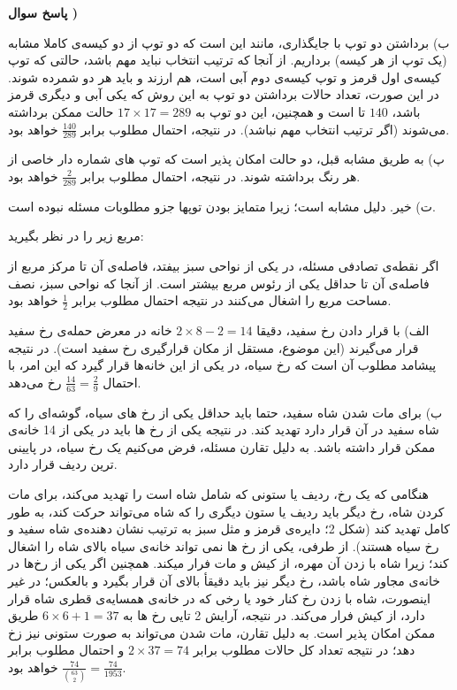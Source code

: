 \documentclass[10pt,letterpaper]{report}
\newcounter{questionanswernumber}
\newcommand{\QA}{
\textbf{پاسخ سوال \thequestionanswernumber)}
\stepcounter{questionanswernumber}
}
\begin{document}
\QA

ب) برداشتن دو توپ با جایگذاری، مانند این است که دو توپ از دو کیسه‌ی کاملا مشابه (یک توپ از هر کیسه) برداریم. از آنجا که ترتیب انتخاب نباید مهم باشد، حالتی که توپ کیسه‌ی اول قرمز و توپ کیسه‌ی دوم آبی است، هم ارزند و باید هر دو شمرده شوند. در این صورت، تعداد حالات برداشتن دو توپ به این روش که یکی آبی و دیگری قرمز باشد،
$
140
$
تا است و همچنین، این دو توپ به 
$
{17\times 17}=289
$
حالت ممکن برداشته می‌شوند (اگر ترتیب انتخاب مهم نباشد). در نتیجه، احتمال مطلوب برابر 
$
\frac{140}{289}
$
خواهد بود.

پ) به طریق مشابه قبل، دو حالت امکان پذیر است که توپ های شماره دار خاصی از هر رنگ برداشته شوند. در نتیجه، احتمال مطلوب برابر 
$
\frac{2}{289}
$
خواهد بود.

ت) خیر. دلیل مشابه است؛ زیرا متمایز بودن توپها جزو مطلوبات مسئله نبوده است.

\Q

مربع زیر را در نظر بگیرید:
\begin{figure}[h]
\centering
{}
\end{figure}
اگر نقطه‌ی تصادفی مسئله، در یکی از نواحی سبز بیفتد، فاصله‌ی آن تا مرکز مربع از فاصله‌ی آن تا حداقل یکی از رئوس مربع بیشتر است. از آنجا که نواحی سبز، نصف مساحت مربع را اشغال می‌کنند در نتیجه احتمال مطلوب برابر 
$
\frac{1}{2}
$
خواهد بود.


\Q

الف) با قرار دادن رخ سفید، دقیقا 
$
2\times 8-2=14
$
خانه در معرض حمله‌ی رخ سفید قرار می‌گیرند (این موضوع، مستقل از مکان قرارگیری رخ سفید است). در نتیجه پیشامد مطلوب آن است که رخ سیاه، در یکی از این خانه‌ها قرار گیرد که این امر، با احتمال 
$
\frac{14}{63}=\frac{2}{9}
$
رخ می‌دهد.

ب) برای مات شدن شاه سفید، حتما باید حداقل یکی از رخ های سیاه، گوشه‌ای را که شاه سفید در آن قرار دارد تهدید کند. در نتیجه یکی از رخ ها باید در یکی از 14 خانه‌ی ممکن قرار داشته باشد. به دلیل تقارن مسئله، فرض می‌کنیم یک رخ سیاه، در پایینی ترین ردیف قرار دارد.

هنگامی که یک رخ، ردیف یا ستونی که شامل شاه است را تهدید می‌کند، برای مات کردن شاه، رخ دیگر باید ردیف یا ستون دیگری را که شاه می‌تواند حرکت کند، به طور کامل تهدید کند (شکل 2؛ دایره‌ی قرمز و مثل سبز به ترتیب نشان دهنده‌ی شاه سفید و رخ سیاه هستند). از طرفی، یکی از رخ ها نمی تواند خانه‌ی سیاه بالای شاه را اشغال کند؛ زیرا شاه با زدن آن مهره، از کیش و مات فرار میکند. همچنین اگر یکی از رخ‌ها در خانه‌ی مجاور شاه باشد، رخ دیگر نیز باید دقیقأ بالای آن قرار بگیرد و بالعکس؛ در غیر اینصورت، شاه با زدن رخ کنار خود یا رخی که در خانه‌ی همسایه‌ی قطری شاه قرار دارد، از کیش فرار می‌کند. در نتیجه، آرایش 2 تایی رخ ها به 
$
6\times 6+1=37
$
طریق ممکن امکان پذیر است. به دلیل تقارن، مات شدن می‌تواند به صورت ستونی نیز زخ دهد؛ در نتیجه تعداد کل حالات مطلوب برابر 
$
2\times 37=74
$
و احتمال مطلوب برابر 
$
\frac{74}{\binom{63}{2}}=\frac{74}{1953}
$
خواهد بود.
\end{document}
